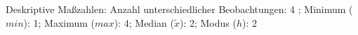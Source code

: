 				\label{tableValues:afin03}
				\vspace*{-\baselineskip}
                    \begin{noten}
                	    \note{} Deskriptive Maßzahlen:
                	    Anzahl unterschiedlicher Beobachtungen: 4%
                	    ; 
                	      Minimum ($min$): 1; 
                	      Maximum ($max$): 4; 
                	      Median ($\tilde{x}$): 2; 
                	      Modus ($h$): 2
                     \end{noten}

